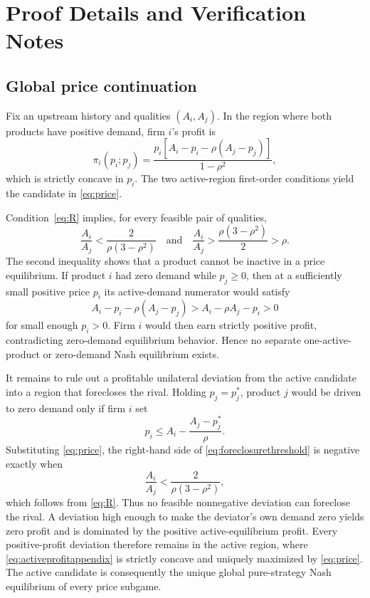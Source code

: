 \section{Proof Details and Verification Notes}

\subsection{Global price continuation}
Fix an upstream history and qualities $(A_i,A_j)$. In the region where both products have positive demand, firm $i$'s profit is
\begin{equation}
 \pi_i(p_i;p_j)=\frac{p_i\left[A_i-p_i-\rho(A_j-p_j)\right]}{1-\rho^2},
 \label{eq:activeprofitappendix}
\end{equation}
which is strictly concave in $p_i$. The two active-region first-order conditions yield the candidate in \eqref{eq:price}.

Condition~\eqref{eq:R} implies, for every feasible pair of qualities,
\begin{equation}
 \frac{A_i}{A_j}
 <\frac{2}{\rho(3-\rho^2)}
 \quad\text{and}\quad
 \frac{A_i}{A_j}
 >\frac{\rho(3-\rho^2)}{2}>\rho.
 \label{eq:qualityratioappendix}
\end{equation}
The second inequality shows that a product cannot be inactive in a price equilibrium. If product $i$ had zero demand while $p_j\geq0$, then at a sufficiently small positive price $p_i$ its active-demand numerator would satisfy
\begin{equation}
 A_i-p_i-\rho(A_j-p_j)
 > A_i-\rho A_j-p_i>0
\end{equation}
for small enough $p_i>0$. Firm $i$ would then earn strictly positive profit, contradicting zero-demand equilibrium behavior. Hence no separate one-active-product or zero-demand Nash equilibrium exists.

It remains to rule out a profitable unilateral deviation from the active candidate into a region that forecloses the rival. Holding $p_j=p_j^*$, product $j$ would be driven to zero demand only if firm $i$ set
\begin{equation}
 p_i\leq A_i-\frac{A_j-p_j^*}{\rho}.
 \label{eq:foreclosurethreshold}
\end{equation}
Substituting \eqref{eq:price}, the right-hand side of \eqref{eq:foreclosurethreshold} is negative exactly when
\begin{equation}
 \frac{A_i}{A_j}<\frac{2}{\rho(3-\rho^2)},
\end{equation}
which follows from \eqref{eq:R}. Thus no feasible nonnegative deviation can foreclose the rival. A deviation high enough to make the deviator's own demand zero yields zero profit and is dominated by the positive active-equilibrium profit. Every positive-profit deviation therefore remains in the active region, where \eqref{eq:activeprofitappendix} is strictly concave and uniquely maximized by \eqref{eq:price}. The active candidate is consequently the unique global pure-strategy Nash equilibrium of every price subgame.

